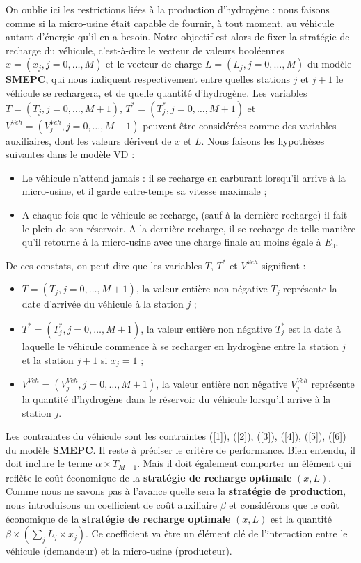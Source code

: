 On oublie ici les restrictions liées à la production d'hydrogène : nous faisons comme si la micro-usine était capable de fournir, à tout moment, au véhicule autant d'énergie qu'il en a besoin. Notre objectif est alors de fixer la stratégie de recharge du véhicule, c'est-à-dire le vecteur de valeurs booléennes $x = (x_j, j = 0, \dots, M)$ et le vecteur de charge $L = (L_j, j = 0, \dots, M)$ du modèle \textbf{SMEPC}, qui nous indiquent respectivement entre quelles stations $j$ et $j+1$ le véhicule se rechargera, et de quelle quantité d'hydrogène. Les variables $T = (T_j, j = 0, \dots, M + 1)$, $T^*= (T^*_j, j = 0, \dots, M + 1)$ et $V^{Veh} = (V^{Veh}_j, j = 0, \dots, M + 1)$ peuvent être considérées comme des variables auxiliaires, dont les valeurs dérivent de $x$ et $L$. Nous faisons les hypothèses suivantes dans le modèle VD : 
\begin{itemize}[label=$\square$]
	\item Le véhicule n'attend jamais : il se recharge en carburant lorsqu'il arrive à la micro-usine, et il garde entre-temps sa vitesse maximale ;
	\item A chaque fois que le véhicule se recharge, (sauf à la dernière recharge) il fait le plein de son réservoir. A la dernière recharge, il se recharge de telle manière qu'il retourne à la micro-usine avec une charge finale au moins égale à $E_0$.
\end{itemize}

De ces constats, on peut dire que les variables $T$, $T^*$ et $V^{Veh}$ signifient : 
\begin{itemize}[label=$\square$]
\item $T= (T_j, j=0, \dots, M+1)$, la valeur entière non négative  $T_j$ représente la date d'arrivée du véhicule à la station $j$ ;
\item $T^*= (T^*_j, j=0, \dots, M+1)$, la valeur entière non négative $T^*_j$ est la date à laquelle le véhicule commence à se recharger en hydrogène entre la station $j$ et la station $j + 1$ si $x_j=1$ ; 
\item $V^{Veh} = (V^{Veh}_j, j=0, \dots, M+1)$, la valeur entière non négative $V^{Veh}_j$ représente la quantité d'hydrogène dans le réservoir du véhicule lorsqu'il arrive à la station $j$.
\end{itemize}
Les contraintes du véhicule sont les contraintes (\ref{1}), (\ref{2}), (\ref{3}), (\ref{4}), (\ref{5}), (\ref{6}) du modèle \textbf{SMEPC}. Il reste à préciser le critère de performance. Bien entendu, il doit inclure le terme $\alpha \times T_{M+1}$. Mais il doit également comporter un élément qui reflète le coût économique de la \textbf{stratégie de recharge optimale} $(x, L)$. Comme nous ne savons pas à l'avance quelle sera la \textbf{stratégie de production}, nous introduisons un coefficient de coût auxiliaire $\beta$ et considérons que le coût économique de la \textbf{stratégie de recharge optimale} $(x, L)$ est la quantité $\beta \times (\sum_j L_j\times x_j)$. Ce coefficient va être un élément clé de l'interaction entre le véhicule (demandeur) et la micro-usine (producteur). %

